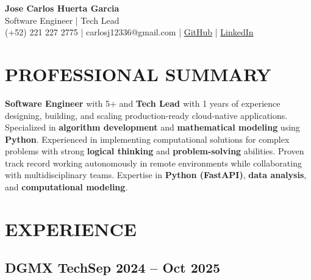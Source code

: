 \documentclass[a4paper,10pt]{article}
\newcommand{\kw}[1]{\textbf{\textcolor{keyword}{#1}}}
\begin{document}
\begin{center}
{\bfseries\LARGE Jose Carlos Huerta Garcia} \\
Software Engineer | Tech Lead \\
(+52) 221 227 2775 | carlosj12336@gmail.com | \href{https://github.com/jcarloshg}{GitHub} | \href{https://www.linkedin.com/in/jose-carlos-huerta-garcia-773952212}{LinkedIn}
\end{center}

\section*{PROFESSIONAL SUMMARY}
\kw{Software Engineer} with 5+ and \kw{Tech Lead } with 1 years of experience designing, building, and scaling production-ready cloud-native applications. Specialized in \kw{algorithm development} and \kw{mathematical modeling} using \kw{Python}. Experienced in implementing computational solutions for complex problems with strong \kw{logical thinking} and \kw{problem-solving} abilities. Proven track record working autonomously in remote environments while collaborating with multidisciplinary teams. Expertise in \kw{Python (FastAPI)}, \kw{data analysis}, and \kw{computational modeling}.

\section*{EXPERIENCE}

\subsection*{\small DGMX Tech\hfill\textbf{Sep 2024 -- Oct 2025}}
\end{document}
